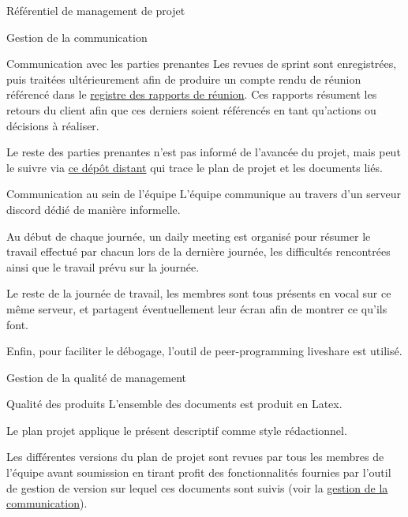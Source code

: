 \documentclass[]{article}
\begin{document}
{\begin{section}{\label{sec:Référentiel de management de projet}Référentiel de management de projet}
\begin{subsection}{\label{sec:Gestion de la communication}Gestion de la communication}
\begin{subsubsection}{\label{sec:Communication avec les parties prenantes}Communication avec les parties prenantes}
             Les revues de sprint sont enregistrées, puis traitées ultérieurement afin de produire un compte rendu de réunion référencé dans le \href{documents/Registre_des_rapports_de_réunion.pdf}{registre des rapports de réunion}. Ces rapports résument les retours du client afin que ces derniers soient référencés en tant qu’actions ou décisions à réaliser.

             Le reste des parties prenantes n'est pas informé de l’avancée du projet, mais peut le suivre via \href{https://github.com/Szyckaa/UE-PROJET-DOCS-GESTION}{ce dépôt distant} qui trace le plan de projet et les documents liés.
         \end{subsubsection}

         \newpage

         \begin{subsubsection}{\label{sec:Communication au sein de l'équipe}Communication au sein de l'équipe}
             L’équipe communique au travers d’un serveur discord dédié de manière informelle.

             Au début de chaque journée, un daily meeting est organisé pour résumer le travail effectué par chacun lors de la dernière journée, les difficultés rencontrées ainsi que le travail prévu sur la journée.

             Le reste de la journée de travail, les membres sont tous présents en vocal sur ce même serveur, et partagent éventuellement leur écran afin de montrer ce qu’ils font.

             Enfin, pour faciliter le débogage, l’outil de peer-programming liveshare est utilisé.
         \end{subsubsection}
     \end{subsection}

     \begin{subsection}{\label{sec:Gestion de la qualité de management}Gestion de la qualité de management}
         \begin{subsubsection}{\label{sec:Qualité des produits}Qualité des produits}
            L'ensemble des documents est produit en Latex.

            Le plan projet applique le présent descriptif comme style rédactionnel. 

             Les différentes versions du plan de projet sont revues par tous les membres de l’équipe avant soumission en tirant profit des fonctionnalités fournies par l'outil de gestion de version sur lequel ces documents sont suivis (voir la \hyperref[sec:Communication avec les parties prenantes]{gestion de la communication}).


\end{subsubsection}
\end{subsection}
\end{section}}
\end{document}
